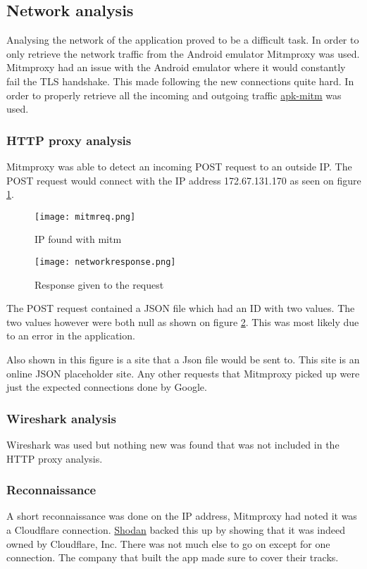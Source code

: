 \subsection{Network analysis}

Analysing the network of the application proved to be a difficult task. 
In order to only retrieve the network traffic from the Android emulator Mitmproxy was used.
Mitmproxy had an issue with the Android emulator where it would constantly fail the TLS handshake. 
This made following the new connections quite hard. 
In order to properly retrieve all the incoming and outgoing traffic \href{https://github.com/shroudedcode/apk-mitm}{apk-mitm} was used.

\subsubsection{HTTP proxy analysis}

Mitmproxy was able to detect an incoming POST request to an outside IP. 
The POST request would connect with the IP address 172.67.131.170 as seen on figure \ref{tim-mitmrequest}.

\begin{figure}[H]
    \texttt{[image: mitmreq.png]}
    \caption{IP found with mitm}
    \label{tim-mitmrequest}
\end{figure}

\begin{figure}[H]
    \texttt{[image: networkresponse.png]}
    \caption{Response given to the request}
    \label{tim-mitmresponse}
\end{figure}

The POST request contained a JSON file which had an ID with two values. 
The two values however were both null as shown on figure \ref{tim-mitmresponse}.
This was most likely due to an error in the application. 

Also shown in this figure is a site that a Json file would be sent to.
This site is an online JSON placeholder site.
Any other requests that Mitmproxy picked up were just the expected connections done by Google.

\subsubsection{Wireshark analysis}
Wireshark was used but nothing new was found that was not included in the HTTP proxy analysis.

\subsubsection{Reconnaissance}

A short reconnaissance was done on the IP address, Mitmproxy had noted it was a Cloudflare connection.
\href{https://www.shodan.io/host/172.67.131.170}{Shodan} backed this up by showing that it was indeed owned by Cloudflare, Inc.
There was not much else to go on except for one connection.
The company that built the app made sure to cover their tracks.
